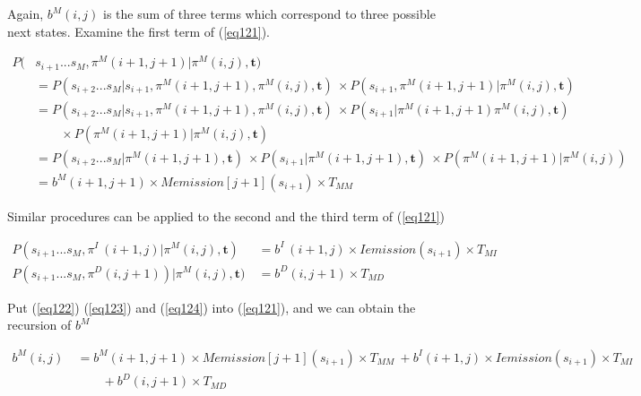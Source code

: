 \documentclass[10pt]{article}
\begin{document}
    Again, $b^{M}(i, j)$ is the sum of three terms which correspond to three possible next states. Examine the first term of (\ref{eq121}).

    \begin{equation} \label{eq122}
    \begin{aligned}
      P(&s_{i+1}...s_M, \pi^M(i+1, j+1) | \pi^M(i, j), \mathbf{t}) \\
        &= P(s_{i+2}...s_M | s_{i+1}, \pi^M(i+1, j+1), \pi^M(i, j), \mathbf{t}) \
          \times P(s_{i+1}, \pi^M(i+1, j+1) | \pi^M(i, j), \mathbf{t}) \\
        &= P(s_{i+2}...s_M | s_{i+1}, \pi^M(i+1, j+1), \pi^M(i, j), \mathbf{t}) \
          \times P(s_{i+1} | \pi^M(i+1, j+1) \pi^M(i, j), \mathbf{t}) \\
          &\qquad\times P(\pi^M(i+1, j+1) | \pi^M(i, j), \mathbf{t}) \\
        &= P(s_{i+2}...s_M | \pi^M(i+1, j+1), \mathbf{t}) \
          \times P(s_{i+1} | \pi^M(i+1, j+1), \mathbf{t}) \
          \times P(\pi^M(i+1, j+1) | \pi^M(i, j)) \\
        &= b^M(i+1, j+1) \times Memission[j+1](s_{i+1}) \times T_{MM}
    \end{aligned}
    \end{equation}

    Similar procedures can be applied to the second and the third term of (\ref{eq121})

    \begin{align}
      P(s_{i+1}...s_M, \pi^{I\;}(i+1, j) | \pi^M(i, j), \mathbf{t}) \
        &= b^{I\;}(i+1, j) \times Iemission(s_{i+1}) \times T_{MI} \label{eq123}\\
      P(s_{i+1}...s_M, \pi^{D}(i, j+1)) | \pi^M(i, j), \mathbf{t}) \
        &= b^{D}(i, j+1) \times T_{MD} \label{eq124}
    \end{align}

    Put (\ref{eq122}) (\ref{eq123}) and (\ref{eq124}) into (\ref{eq121}), and we can obtain the recursion of $b^{M}$

    \begin{equation}
    \begin{aligned}
      b^M(i, j) \
        &= b^M(i+1, j+1) \times Memission[j+1](s_{i+1}) \times T_{MM} \
          + b^{I}(i+1, j) \times Iemission(s_{i+1}) \times T_{MI} \\
          &\qquad+ b^{D}(i, j+1) \times T_{MD}
    \end{aligned}
    \end{equation}
\end{document}
